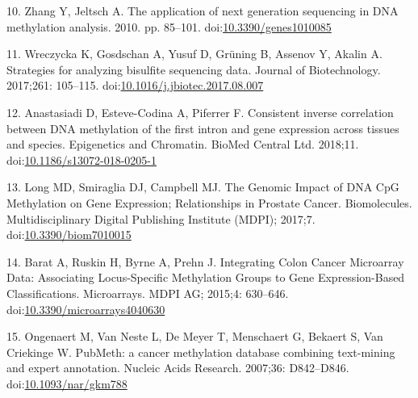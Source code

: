 \documentclass[10pt,letterpaper]{article}
\begin{document}
\leavevmode\hypertarget{ref-Zhang2010}{}%
10. Zhang Y, Jeltsch A. The application of next generation sequencing in
DNA methylation analysis. 2010. pp. 85--101.
doi:\href{https://doi.org/10.3390/genes1010085}{10.3390/genes1010085}

\leavevmode\hypertarget{ref-Wreczycka2017}{}%
11. Wreczycka K, Gosdschan A, Yusuf D, Grüning B, Assenov Y, Akalin A.
Strategies for analyzing bisulfite sequencing data. Journal of
Biotechnology. 2017;261: 105--115.
doi:\href{https://doi.org/10.1016/j.jbiotec.2017.08.007}{10.1016/j.jbiotec.2017.08.007}

\leavevmode\hypertarget{ref-Anastasiadi2018}{}%
12. Anastasiadi D, Esteve-Codina A, Piferrer F. Consistent inverse
correlation between DNA methylation of the first intron and gene
expression across tissues and species. Epigenetics and Chromatin. BioMed
Central Ltd. 2018;11.
doi:\href{https://doi.org/10.1186/s13072-018-0205-1}{10.1186/s13072-018-0205-1}

\leavevmode\hypertarget{ref-Long2017}{}%
13. Long MD, Smiraglia DJ, Campbell MJ. The Genomic Impact of DNA CpG
Methylation on Gene Expression; Relationships in Prostate Cancer.
Biomolecules. Multidisciplinary Digital Publishing Institute (MDPI);
2017;7.
doi:\href{https://doi.org/10.3390/biom7010015}{10.3390/biom7010015}

\leavevmode\hypertarget{ref-Barat2015}{}%
14. Barat A, Ruskin H, Byrne A, Prehn J. Integrating Colon Cancer
Microarray Data: Associating Locus-Specific Methylation Groups to Gene
Expression-Based Classifications. Microarrays. MDPI AG; 2015;4:
630--646.
doi:\href{https://doi.org/10.3390/microarrays4040630}{10.3390/microarrays4040630}

\leavevmode\hypertarget{ref-Ongenaert2007}{}%
15. Ongenaert M, Van Neste L, De Meyer T, Menschaert G, Bekaert S, Van
Criekinge W. PubMeth: a cancer methylation database combining
text-mining and expert annotation. Nucleic Acids Research. 2007;36:
D842--D846.
doi:\href{https://doi.org/10.1093/nar/gkm788}{10.1093/nar/gkm788}

\nolinenumbers
\end{document}
